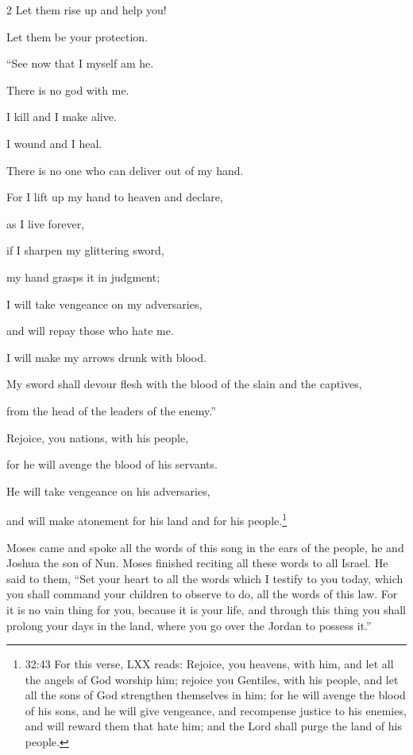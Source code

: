 \begin{multicols}{2}
Let them rise up and help you!

Let them be your protection.


\vspace{\baselineskip}
 \myverse{}“See now that I myself am he.

There is no god with me.

I kill and I make alive.

I wound and I heal.

There is no one who can deliver out of my hand.

\myverse{}For I lift up my hand to heaven and declare,

as I live forever,

\myverse{}if I sharpen my glittering sword,

my hand grasps it in judgment;

I will take vengeance on my adversaries,

and will repay those who hate me.

\myverse{}I will make my arrows drunk with blood.

My sword shall devour flesh with the blood of the slain and the captives,

from the head of the leaders of the enemy.”


\vspace{\baselineskip} 
\myverse{}Rejoice, you nations, with his people,

for he will avenge the blood of his servants.
\end{multicols}

He will take vengeance on his adversaries,

and will make atonement for his land and for his people.\footnote{32:43 For this verse, LXX reads: Rejoice, you heavens, with him, and let all the angels of God worship him; rejoice you Gentiles, with his people, and let all the sons of God strengthen themselves in him; for he will avenge the blood of his sons, and he will give vengeance, and recompense justice to his enemies, and will reward them that hate him; and the Lord shall purge the land of his people.}


\myverse{}Moses came and spoke all the words of this song in the ears
of the people, he and Joshua the son of Nun.
\myverse{}Moses finished reciting all these words to all Israel.
\myverse{}He said to them, “Set your heart to all the words which I testify to you
today, which you shall command your children to observe to do, all the words of this law.
\myverse{}For it is no vain thing for you, because it is your life, and through this
thing you shall prolong your days in the land, where you go over the Jordan to possess it.”

